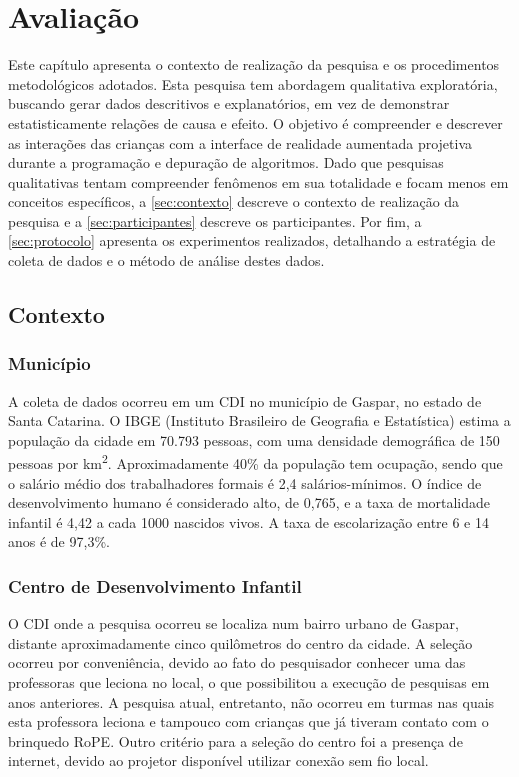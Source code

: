 \chapter{Avaliação}
\label{c_avaliacao}
Este capítulo apresenta o contexto de realização da pesquisa e os procedimentos metodológicos adotados. Esta pesquisa tem abordagem qualitativa exploratória, buscando gerar dados descritivos e explanatórios, em vez de demonstrar estatisticamente relações de causa e efeito. O objetivo é compreender e descrever as interações das crianças com a interface de realidade aumentada projetiva durante a programação e depuração de algoritmos. Dado que pesquisas qualitativas tentam compreender fenômenos em sua totalidade e focam menos em conceitos específicos, a \autoref{sec:contexto} descreve o contexto de realização da pesquisa e a \autoref{sec:participantes} descreve os participantes. Por fim, a \autoref{sec:protocolo} apresenta os experimentos realizados, detalhando a estratégia de coleta de dados e o método de análise destes dados.

\section{Contexto}
\label{sec:contexto}
\subsection{Município}
A coleta de dados ocorreu em um \ac{CDI} no município de Gaspar, no estado de Santa Catarina. O IBGE (Instituto Brasileiro de Geografia e Estatística) estima a população da cidade em 70.793 pessoas, com uma densidade demográfica de 150 pessoas por km\textsuperscript{2}. Aproximadamente 40\% da população tem ocupação, sendo que o salário médio dos trabalhadores formais é 2,4 salários-mínimos. O índice de desenvolvimento humano é considerado alto, de 0,765, e a taxa de mortalidade infantil é 4,42 a cada 1000 nascidos vivos. A taxa de escolarização entre 6 e 14 anos é de 97,3\%.
\subsection{Centro de Desenvolvimento Infantil}
\label{sec:cdi}
O \ac{CDI} onde a pesquisa ocorreu se localiza num bairro urbano de Gaspar, distante aproximadamente cinco quilômetros do centro da cidade. A seleção ocorreu por conveniência, devido ao fato do pesquisador conhecer uma das professoras que leciona no local, o que possibilitou a execução de pesquisas em anos anteriores. A pesquisa atual, entretanto, não ocorreu em turmas nas quais esta professora leciona e tampouco com crianças que já tiveram contato com o brinquedo RoPE. Outro critério para a seleção do centro foi a presença de internet, devido ao projetor disponível utilizar conexão sem fio local.

